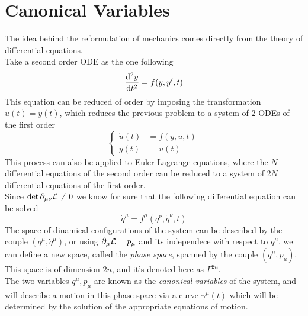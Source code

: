 \documentclass[../admech.tex]{subfiles}
\begin{document}
\section{Canonical Variables}
The idea behind the reformulation of mechanics comes directly from the theory of differential equations.\\
Take a second order ODE as the one following
\begin{equation*}
	\dv[2]{y}{t}=f(y,y',t)
\end{equation*}
This equation can be reduced of order by imposing the transformation $u(t)=\dot{y}(t)$, which reduces the previous problem to a system of 2 ODEs of the first order
\begin{equation*}
	\left\{ \begin{aligned}
			\dot{u}(t)&=f(y,u,t)\\
			\dot{y}(t)&=u(t)
	\end{aligned}\right.
\end{equation*}
This process can also be applied to Euler-Lagrange equations, where the $N$ differential equations of the second order can be reduced to a system of $2N$ differential equations of the first order.\\
Since $\det\dot{\partial}_{\mu\nu}\mathcal{L}\ne0$ we know for sure that the following differential equation can be solved
\begin{equation}
	\dot{q}^\mu=f^\mu(q^\nu,\dot{q}^\nu,t)
	\label{eq:lagred}
\end{equation}
The space of dinamical configurations of the system can be described by the couple $(q^\mu,\dot{q}^\mu)$, or using $\dot{\partial}_\mu\mathcal{L}=p_\mu$ and its independece with respect to $q^\mu$, we can define a new space, called the \emph{phase space}, spanned by the couple $(q^\mu,p_\mu)$. This space is of dimension $2n$, and it's denoted here as $\Gamma^{2n}$.\\
The two variables $q^\mu,p_\mu$ are known as the \emph{canonical variables} of the system, and will describe a motion in this phase space via a curve $\gamma^\mu(t)$ which will be determined by the solution of the appropriate equations of motion.
\end{document}
